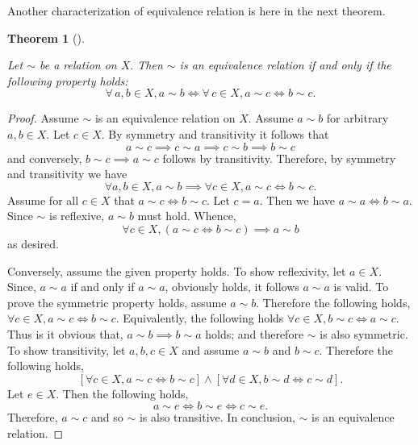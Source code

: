 \documentclass[
  letterpaper,
  10pt,
  reqno,
  twopage,
  openany]{book}
\theoremstyle{plain}
\theoremstyle{definition}
\theoremstyle{definition}
\theoremstyle{definition}
\theoremstyle{plain}
\theoremstyle{plain}
\newtheorem{theorem}{Theorem}[chapter]
\theoremstyle{remark}
\begin{document}
Another characterization of equivalence relation is here in the next
theorem.

\leavevmode{}%
\begin{theorem}[]\label{thm-equivalence-relation-if-and-only-if-property}

Let \(\sim\) be a relation on \(X.\) Then \(\sim\) is an equivalence
relation if and only if the following property holds: \begin{equation}
\forall \, a,b\in X, a\sim b  \Leftrightarrow \forall \, c\in X, a\sim c \Leftrightarrow b\sim c.
\end{equation}

\end{theorem}

\begin{proof}

Assume \(\sim\) is an equivalence relation on \(X.\) Assume \(a\sim b\)
for arbitrary \(a,b\in X.\) Let \(c\in X.\) By symmetry and transitivity
it follows that \[
a\sim c \implies c\sim a \implies c\sim b \implies b\sim c
\] and conversely, \(b\sim c \implies a\sim c\) follows by transitivity.
Therefore, by symmetry and transitivity we have \[
\forall a,b \in X, a\sim b \implies \forall c\in X, a\sim c \Leftrightarrow b\sim c.
\] Assume for all \(c\in X\) that \(a\sim c \Leftrightarrow b\sim c.\)
Let \(c=a.\) Then we have \(a\sim a \Leftrightarrow b\sim a.\) Since
\(\sim\) is reflexive, \(a\sim b\) must hold. Whence, \[
\forall c\in X, (a\sim c \Leftrightarrow b\sim c) \implies a\sim b
\] as desired.

Conversely, assume the given property holds. To show reflexivity, let
\(a\in X.\) Since, \(a\sim a\) if and only if \(a\sim a\), obviously
holds, it follows \(a\sim a\) is valid. To prove the symmetric property
holds, assume \(a\sim b.\) Therefore the following holds,
\(\forall c\in X, a\sim c \Leftrightarrow b\sim c.\) Equivalently, the
following holds \(\forall c\in X, b\sim c \Leftrightarrow a\sim c.\)
Thus is it obvious that, \(a\sim b \implies b\sim a\) holds; and
therefore \(\sim\) is also symmetric. To show transitivity, let
\(a,b,c\in X\) and assume \(a\sim b\) and \(b\sim c.\) Therefore the
following holds, \[
[\forall c\in X, a\sim c \Leftrightarrow b \sim c] 
\land 
[\forall d\in X, b\sim d \Leftrightarrow c \sim d]. 
\] Let \(e\in X.\) Then the following holds, \[
a\sim e \Leftrightarrow b\sim e \Leftrightarrow c\sim e.
\] Therefore, \(a\sim c\) and so \(\sim\) is also transitive. In
conclusion, \(\sim\) is an equivalence relation.

\end{proof}
\end{document}
